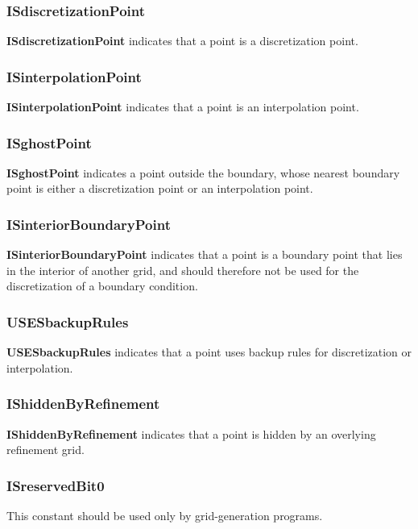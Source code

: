 \documentclass{article}
\begin{document}
  \subsubsection{ISdiscretizationPoint}
  \label{MappedGrid::ISdiscretizationPoint}
    \textbf{ISdiscretizationPoint} indicates that a point is a discretization point.

  \subsubsection{ISinterpolationPoint}
  \label{MappedGrid::ISinterpolationPoint}
    \textbf{ISinterpolationPoint} indicates that a point is an interpolation point.

  \subsubsection{ISghostPoint}
  \label{MappedGrid::ISghostPoint}
    \textbf{ISghostPoint} indicates a point outside the boundary, whose nearest boundary point is either a discretization point or an interpolation point.

  \subsubsection{ISinteriorBoundaryPoint}
  \label{MappedGrid::ISinteriorBoundaryPoint}
    \textbf{ISinteriorBoundaryPoint} indicates that a point is a boundary point that lies in the interior of another grid,
    and should therefore not be used for the discretization of a boundary condition.

  \subsubsection{USESbackupRules}
  \label{MappedGrid::USESbackupRules}
    \textbf{USESbackupRules} indicates that a point uses backup rules for discretization or interpolation.

  \subsubsection{IShiddenByRefinement}
  \label{MappedGrid::IShiddenByRefinement}
    \textbf{IShiddenByRefinement} indicates that a point is hidden by an overlying refinement grid.

  \subsubsection{ISreservedBit0}
  \label{MappedGrid::ISreservedBit0}
     This constant should be used only by grid-generation programs.
\end{document}
